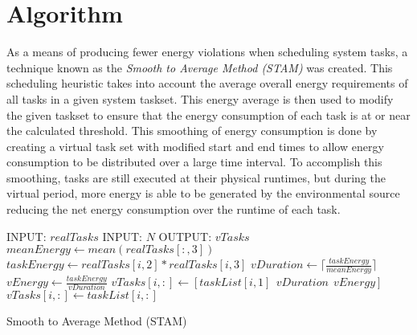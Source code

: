 
\section{Algorithm} \label{sec:algorithm}

As a means of producing fewer energy violations when scheduling system tasks, a technique known as the \emph{Smooth to Average Method (STAM)} was created. This scheduling heuristic takes into account the average overall energy requirements of all tasks in a given system taskset. This energy average is then used to modify the given taskset to ensure that the energy consumption of each task is at or near the calculated threshold. This smoothing of energy consumption is done by creating a virtual task set with modified start and end times to allow energy consumption to be distributed over a large time interval. To accomplish this smoothing, tasks are still executed at their physical runtimes, but during the virtual period, more energy is able to be generated by the environmental source reducing the net energy consumption over the runtime of each task.

\begin{algorithm}[tb]
\label{stamalg}
\begin{algorithmic}
\STATE INPUT: $realTasks$  
\STATE INPUT: $N$ 
\STATE OUTPUT: $vTasks$ 
\STATE $meanEnergy \gets mean(realTasks[:,3])$
\STATE $taskEnergy \gets realTasks[i, 2] * realTasks[i,3]$
\STATE $vDuration \gets \lceil \frac{taskEnergy}{meanEnergy} \rceil$
\STATE $vEnergy \gets \frac{taskEnergy}{vDuration}$
\STATE $vTasks[i,:] \gets [taskList[i,1]~~vDuration~~vEnergy]$
\ELSE
\STATE $vTasks[i,:] \gets taskList[i,:]$
\ENDIF
\ENDFOR
\end{algorithmic}
\caption{Smooth to Average Method (STAM)}
\end{algorithm}